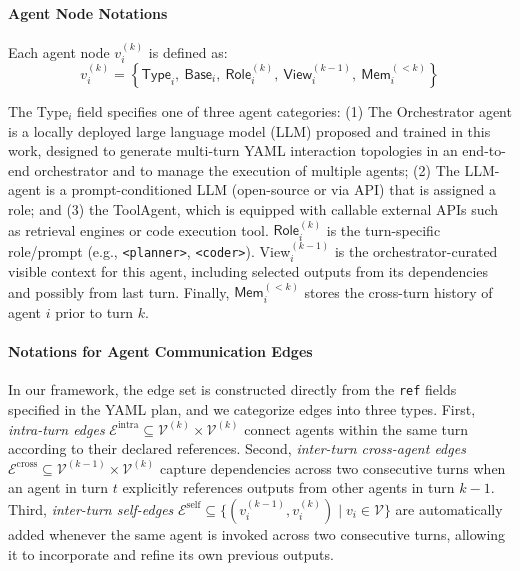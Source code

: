 \documentclass{article}
\theoremstyle{definition}
\begin{document}
\paragraph{Agent Node Notations}  
Each agent node $v_i^{(k)}$ is defined as:
\[
v_i^{(k)} = \left\{
\textsf{Type}_i,\ \textsf{Base}_i,\ \textsf{Role}_i^{(k)},\ \textsf{View}_i^{(k-1)},\ \textsf{Mem}_i^{(<k)}
\right\}
\tag{1}
\]

The \textsf{Type}$_i$ field specifies one of three agent categories: (1) The Orchestrator agent is a locally deployed large language model (LLM) proposed and trained in this work, designed to generate multi-turn YAML interaction topologies in an end-to-end orchestrator and to manage the execution of multiple agents; (2) The LLM-agent is a prompt-conditioned LLM (open-source or via API) that is assigned a role; and (3) the ToolAgent, which is equipped with callable external APIs such as retrieval engines or code execution tool. $\textsf{Role}_i^{(k)}$ is the turn-specific role/prompt (e.g., \texttt{<planner>}, \texttt{<coder>}). \textsf{View}$_i^{(k-1)}$ is the orchestrator-curated visible context for this agent, including selected outputs from its dependencies and possibly from last turn. Finally, $\textsf{Mem}_i^{(<k)}$ stores the cross-turn history of agent $i$ prior to turn $k$.

\paragraph{Notations for Agent Communication Edges}  
In our framework, the edge set is constructed directly from the \texttt{ref} fields specified in the YAML plan, and we categorize edges into three types. First, \emph{intra-turn edges} $\mathcal{E}^{\text{intra}} \subseteq \mathcal{V}^{(k)} \times \mathcal{V}^{(k)}$ connect agents within the same turn according to their declared references. Second, \emph{inter-turn cross-agent edges} $\mathcal{E}^{\text{cross}} \subseteq \mathcal{V}^{(k-1)} \times \mathcal{V}^{(k)}$ capture dependencies across two consecutive turns when an agent in turn $t$ explicitly references outputs from other agents in turn $k\!-\!1$. Third, \emph{inter-turn self-edges} $\mathcal{E}^{\text{self}} \subseteq \{(v_i^{(k-1)}, v_i^{(k)}) \mid v_i \in \mathcal{V}\}$ are automatically added whenever the same agent is invoked across two consecutive turns, allowing it to incorporate and refine its own previous outputs.
\end{document}
